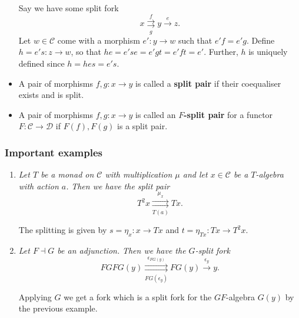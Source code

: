 \documentclass[10pt]{article}
\newcommand{\ccat}{\mathcal{C}}
\newcommand{\dcat}{\mathcal{D}}
\begin{document}
\begin{itemize}
                        Say we have some split fork
                        \begin{equation*}
                            x\underset{g}{\overset{f}{\rightrightarrows}} y\xrightarrow{e}z.
                        \end{equation*}
                        Let $w\in\ccat$ come with a morphism $e'\colon y\to w$ such that $e'f=e'g$.
                        Define $h=e's\colon z\to w$, so that $he=e'se=e'gt=e'ft=e'$.
                        Further, $h$ is uniquely defined since $h=hes=e's$.
                    \item A pair of morphisms $f,g\colon x\to y$ is called a \textbf{split pair} if their coequaliser exists and is split.
                    \item A pair of morphisms $f,g\colon x\to y$ is called an \textbf{$F$-split pair} for a functor $F\colon\ccat\to\dcat$ if $F(f),F(g)$ is a split pair.
                \end{itemize}

            \subsubsection{Important examples}

                \begin{enumerate}
                    \item \emph{Let $T$ be a monad on $\ccat$ with multiplication $\mu$ and let $x\in\ccat$ be a $T$-algebra with action $a$.}
                        \emph{Then we have the split pair}
                        \begin{equation*}
                            T^2x \underset{T(a)}{\overset{\mu_x}{\rightrightarrows}} Tx.
                        \end{equation*}

                        The splitting is given by $s=\eta_x\colon x\to Tx$ and $t=\eta_{Tx}\colon Tx\to T^2x$.
                    \item \emph{Let $F\dashv G$ be an adjunction.}
                        \emph{Then we have the $G$-split fork}
                        \begin{equation*}
                            FGFG(y) \underset{FG(\epsilon_y)}{\overset{\epsilon_{FG(y)}}{\rightrightarrows}} FG(y) \xrightarrow{\epsilon_y} y.
                        \end{equation*}

                        Applying $G$ we get a fork which is a split fork for the $GF$-algebra $G(y)$ by the previous example.
                \end{enumerate}
\end{document}
